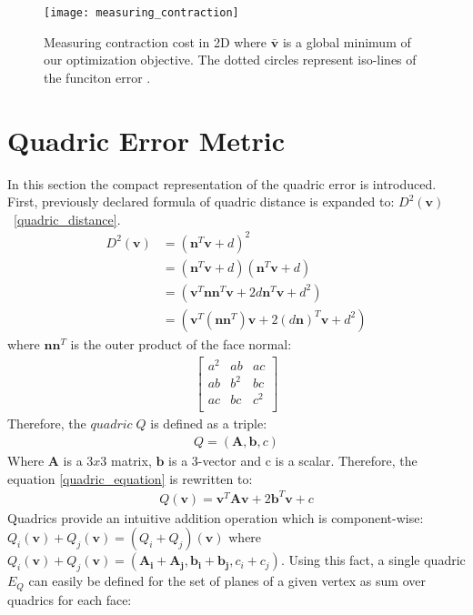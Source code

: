 \begin{figure}[H]
  \begin{center}
    \texttt{[image: measuring\_contraction]}
    \caption{Measuring contraction cost in 2D where $\bar{\mathbf{v}}$ is a global minimum of our optimization objective. The dotted circles represent iso-lines of the funciton error \cite{garland99}.}
    \label{fig:measuring_contraction_ref}
  \end{center}
\end{figure}

\section{Quadric Error Metric}

In this section the compact representation of the quadric error is introduced. First, previously declared formula of quadric distance is expanded to: $D^2(\mathbf{v})$~\ref{quadric_distance}.
\begin{align}
D^2(\mathbf{v})&=(\mathbf{n}^T\mathbf{v}+d)^2\\
	  &=(\mathbf{n}^T\mathbf{v}+d)(\mathbf{n}^T\mathbf{v}+d)\\
	  &=(\mathbf{v}^T\mathbf{n}\mathbf{n}^T\mathbf{v}+2d\mathbf{n}^T\mathbf{v}+d^2)\\
	  &=(\mathbf{v}^T(\mathbf{n}\mathbf{n}^T)\mathbf{v}+2(d\mathbf{n})^T\mathbf{v}+d^2)
	  \label{quadric_equation}
\end{align}
where $\mathbf{n}\mathbf{n}^T$ is the outer product of the face normal:
\begin{align}
\left[
\begin{array}{rrrr}
a^2 & ab & ac   \\
ab  & b^2 & bc  \\
ac  & bc  & c^2 \\
\end{array}\right]
\end{align}
Therefore, the $quadric\;Q$ is defined as a triple:
\begin{align}
Q = (\mathbf{A},\mathbf{b},c)
\end{align}
Where $\mathbf{A}$ is a $3x3$ matrix, $\mathbf{b}$ is a 3-vector and c is a scalar. Therefore, the equation \ref{quadric_equation} is rewritten to:
\begin{align}
Q(\mathbf{v}) = \mathbf{v}^T\mathbf{A}\mathbf{v} + 2\mathbf{b}^T\mathbf{v} + c
\end{align}
Quadrics provide an intuitive addition operation which is component-wise: $Q_i(\mathbf{v}) + Q_j(\mathbf{v}) = (Q_i + Q_j)(\mathbf{v})$ where $Q_i(\mathbf{v}) + Q_j(\mathbf{v}) = (\mathbf{A_i} + \mathbf{A_j}, \mathbf{b_i} + \mathbf{b_j}, c_i + c_j)$. Using this fact, a single quadric $E_Q$ can easily be defined for the set of planes of a given vertex \cite{garland99} as sum over quadrics for each face:
